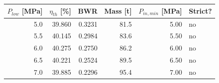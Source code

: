 \begin{tabular}{@{}rrrrrl@{}}
\toprule
$P_{low}$ [MPa] & $\eta_{th}$ [\%] & BWR & Mass [t] & $P_{in,min}$ [MPa] & Strict? \\
\midrule
5.0 & 39.860 & 0.3231 & 81.5 & 5.00 & no \\
5.5 & 40.145 & 0.2984 & 83.6 & 5.50 & no \\
6.0 & 40.275 & 0.2750 & 86.2 & 6.00 & no \\
6.5 & 40.221 & 0.2524 & 89.5 & 6.50 & no \\
7.0 & 39.885 & 0.2296 & 95.4 & 7.00 & no \\
\bottomrule
\end{tabular}
